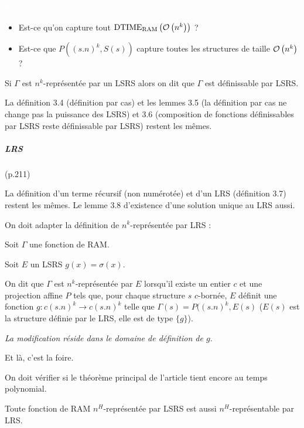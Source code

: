 \documentclass{article}
\newcommand{\dtimeram}{\text{DTIME}_{\text{RAM}}\left( \grozo{ n^k }\right)}
\begin{document}
		
		\begin{probs} \textcolor{white}{T} %
			\begin{itemize}
				\setlength{\itemsep}{-1mm}
				\item 	Est-ce qu'on capture tout $\dtimeram$ ? 
				\item 	Est-ce que $P((s.n)^k, S(s))$ capture toutes les structures de taille $\mathcal{O}\left( n^k \right)$ ?
			\end{itemize}
		\end{probs}
			
	
		Si $\Gamma$ est $n^k$-représentée par un LSRS alors on dit que $\Gamma$ est définissable par LSRS. 
		
		
		
		La définition 3.4 (définition par cas) et les lemmes 3.5 (la définition par cas ne change pas la puissance des LSRS) et 3.6 (composition de fonctions définissables par LSRS reste définissable par LSRS) restent les mêmes.
		
		
		\subparagraph{LRS} (p.211)
		
		
		La définition d'un terme récursif (non numérotée) et d'un LRS (définition 3.7) restent les mêmes. Le lemme 3.8 d'existence d'une solution unique au LRS aussi. 
		
		On doit adapter la définition de $n^k$-représentée par LRS : 
		
		\begin{definition}
			Soit $\Gamma$ une fonction de RAM. 
			
			Soit $E$ un LSRS $g(x) = \sigma(x)$. 
			
			On dit que $\Gamma$ est $n^k$-représentée par $E$ lorsqu'il existe un entier $c$ et une projection affine $P$ tels que, pour chaque structure $s$ $c$-bornée, $E$ définit une fonction $g : c (s.n)^k \to c (s.n)^k$ telle que $\Gamma(s) = P((s.n)^k, E(s)$ ($E(s)$ est la structure définie par le LRS, elle est de type $\{g\}$).
			
			\emph{La modification réside dans le domaine de définition de $g$.}
		\end{definition}
		
		Et là, c'est la foire.
		
		On doit vérifier si le théorème principal de l'article tient encore au temps polynomial.
		
		
		
		\begin{conj}
			Toute fonction de RAM $n^H$-représentée par LSRS est aussi $n^H$-représentable par LRS.
		\end{conj}
		
\end{document}
